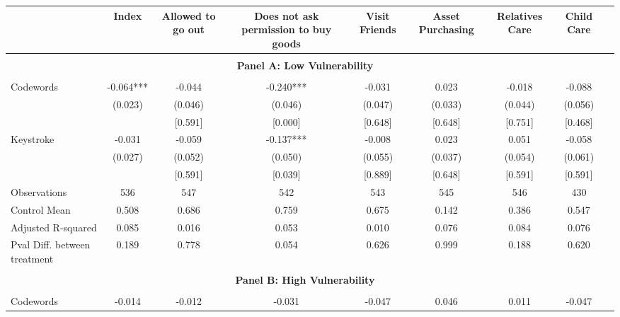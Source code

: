 \begin{tabular}{l*{8}{c}} \hline\hline
                    &\multicolumn{1}{c}{Index}&\multicolumn{1}{c}{Allowed to go out}&\multicolumn{1}{c}{Does not ask permission to buy goods}&\multicolumn{1}{c}{Visit Friends}&\multicolumn{1}{c}{Asset Purchasing}&\multicolumn{1}{c}{Relatives Care}&\multicolumn{1}{c}{Child Care}\\
\hline \\ \multicolumn{8}{c}{\textbf{Panel A: Low Vulnerability}} \\\\[-1ex]
Codewords           &      -0.064***&      -0.044   &      -0.240***&      -0.031   &       0.023   &      -0.018   &      -0.088   \\
                    &     (0.023)   &     (0.046)   &     (0.046)   &     (0.047)   &     (0.033)   &     (0.044)   &     (0.056)   \\
                    &               &     [0.591]   &     [0.000]   &     [0.648]   &     [0.648]   &     [0.751]   &     [0.468]   \\
Keystroke           &      -0.031   &      -0.059   &      -0.137***&      -0.008   &       0.023   &       0.051   &      -0.058   \\
                    &     (0.027)   &     (0.052)   &     (0.050)   &     (0.055)   &     (0.037)   &     (0.054)   &     (0.061)   \\
                    &               &     [0.591]   &     [0.039]   &     [0.889]   &     [0.648]   &     [0.591]   &     [0.591]   \\
\hline
Observations        &         536   &         547   &         542   &         543   &         545   &         546   &         430   \\
Control Mean        &       0.508   &       0.686   &       0.759   &       0.675   &       0.142   &       0.386   &       0.547   \\
Adjusted R-squared  &       0.085   &       0.016   &       0.053   &       0.010   &       0.076   &       0.084   &       0.076   \\
Pval Diff. between treatment&       0.189   &       0.778   &       0.054   &       0.626   &       0.999   &       0.188   &       0.620   \\
\hline \\ \multicolumn{8}{c}{\textbf{Panel B: High Vulnerability}} \\\\[-1ex]
Codewords           &      -0.014   &      -0.012   &      -0.031   &      -0.047   &       0.046   &       0.011   &      -0.047   \\

\end{tabular}
